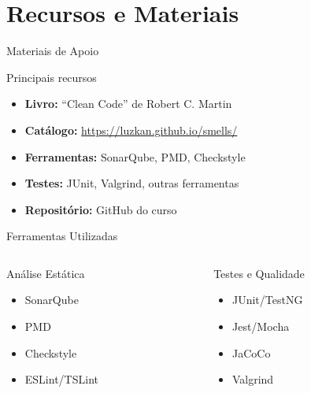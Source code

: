 \documentclass[10pt, aspectratio=169]{beamer}
\begin{document}
\section{Recursos e Materiais}
\begin{frame}{Materiais de Apoio}
\begin{block}{Principais recursos}
\begin{itemize}
    \item \textbf{Livro:} ``Clean Code'' de Robert C. Martin
    \item \textbf{Catálogo:} \url{https://luzkan.github.io/smells/}
    \item \textbf{Ferramentas:} SonarQube, PMD, Checkstyle
    \item \textbf{Testes:} JUnit, Valgrind, outras ferramentas
    \item \textbf{Repositório:} GitHub do curso
\end{itemize}
\end{block}
\end{frame}

\begin{frame}{Ferramentas Utilizadas}
\begin{columns}
\begin{column}{0.5\textwidth}
\begin{block}{Análise Estática}
\begin{itemize}
    \item SonarQube
    \item PMD
    \item Checkstyle
    \item ESLint/TSLint
\end{itemize}
\end{block}
\end{column}
\begin{column}{0.5\textwidth}
\begin{block}{Testes e Qualidade}
\begin{itemize}
    \item JUnit/TestNG
    \item Jest/Mocha
    \item JaCoCo
    \item Valgrind
\end{itemize}
\end{block}
\end{column}
\end{columns}
\end{frame}
\end{document}

